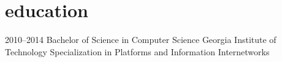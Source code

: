 \documentclass[print]{friggeri-cv} %
\begin{document}

\section{education}

\begin{entrylist}
\entry
{2010--2014}
{Bachelor of Science {\normalfont in Computer Science}}
{Georgia Institute of Technology}
{Specialization in Platforms and Information Internetworks}

\end{entrylist}





\end{document}
